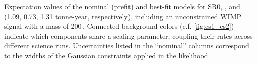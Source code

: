 \documentclass[
    reprint,
    superscriptaddress,
    aps, prl,
    amsmath,amssymb,
    twocolumn,
    showkeys,
    floatfix,
    nofootinbib,
]{revtex4-2}
\begin{document}
\begin{table}[ht]
    \centering
    \caption{Expectation values of the nominal (prefit) and best-fit models for SR0, \sronea, and \sroneb (1.09, 0.73, 1.31 tonne-year, respectively), including an unconstrained WIMP signal with a mass of 200\,\gevcc. Connected background colors (c.f. \cref{fig:cs1_cs2}) indicate which components share a scaling parameter, coupling their rates across different science runs. Uncertainties listed in the ``nominal'' columns correspond to the widths of the Gaussian constraints applied in the likelihood.}
    \label{tab:expectation_values}

    \setlength{\tabcolsep}{-0.1pt}
    \renewcommand{\arraystretch}{1.3} %

    \setlength{\arrayrulewidth}{0.8pt}
    \newcommand{\whline}{\arrayrulecolor{white}\hline\arrayrulecolor{black}}

    \newcommand{\rower}{\rowcolor[HTML]{B1C4F2}}
    \newcommand{\rownr}{\rowcolor[HTML]{FFE09E}}
    \newcommand{\rowac}{\rowcolor[HTML]{C6A1B9}}
    \newcommand{\rowsurface}{\rowcolor[HTML]{B8DBC7}}
    \newcommand{\rowwimp}{\rowcolor[HTML]{EAA280}}

    \newcommand{\cellsep}{\cellcolor[HTML]{FFFFFF}} %



\end{table}
\end{document}
